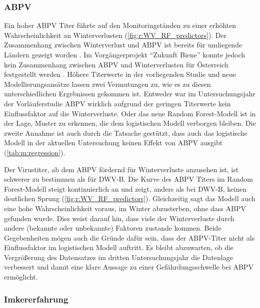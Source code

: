 \subsubsection{ABPV}

Ein hoher ABPV Titer führte auf den Monitoringständen zu einer erhöhten Wahrscheinlichkeit an Winterverlusten (\cref{fig:r:WV_RF_predictors}). Der Zusammenhang zwischen Winterverlust und ABPV ist bereits für umliegende Ländern gezeigt worden \citep{genersch2010,berthoud2010}. Im Vorgängerprojekt \enquote{Zukunft Biene} konnte jedoch kein Zusammenhang zwischen ABPV und Winterverlusten für Österreich festgestellt werden \citep{morawetz2018}. Höhere Titerwerte in der vorliegenden Studie und neue Modellierungsansätze lassen zwei Vermutungen zu, wie es zu diesen unterschiedlichen Ergebnissen gekommen ist. Entweder war im Untersuchungsjahr der Vorläuferstudie ABPV wirklich aufgrund der geringen Titerwerte kein Einflussfaktor auf die Winterverluste. Oder das neue Random Forest-Modell ist in der Lage, Muster zu erkennen, die dem logistischen Modell verborgen bleiben. Die zweite Annahme ist auch durch die Tatsache gestützt, dass auch das logistische Modell in der aktuellen Untersuchung keinen Effekt von ABPV ausgibt (\cref{tab:m:regression}).

Der Virustiter, ab dem ABPV fördernd für Winterverluste anzusehen ist, ist schwerer zu bestimmen als für DWV-B. Die Kurve des ABPV Titers im Random Forest-Modell steigt kontinuierlich an und zeigt, anders als bei DWV-B, keinen deutlichen Sprung (\cref{fig:r:WV_RF_predictors}). Gleichzeitig sagt das Modell auch eine hohe Wahrscheinlichkeit voraus, im Winter abzusterben, ohne dass ABPV gefunden wurde. Dies weist darauf hin, dass viele der Winterverluste durch andere (bekannte oder unbekannte) Faktoren zustande kommen. Beide Gegebenheiten mögen auch die Gründe dafür sein, dass der ABPV-Titer nicht als Einflussfaktor im logistischen Modell auftritt. Es bleibt abzuwarten, ob die Vergrößerung des Datensatzes im dritten Untersuchungsjahr die Datenlage verbessert und damit eine klare Aussage zu einer Gefährdungsschwelle bei ABPV ermöglicht.

\subsubsection{Imkererfahrung}

